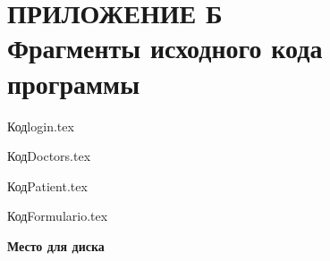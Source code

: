 \newsection
\section*{ПРИЛОЖЕНИЕ Б \\ Фрагменты исходного кода программы}\label{ПРИЛОЖЕНИЕ}

Кодlogin.tex


КодDoctors.tex


\newpage
КодPatient.tex


\newpage
КодFormulario.tex


\newpage
{}

\begin{center}
\textbf{Место для диска}
\end{center}
